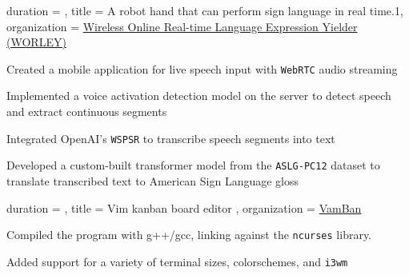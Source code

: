 \documentclass[sidebar-width=2.25in, primary=slate]{clean-resume}
\begin{document}
  \newpage

    \begin{experience}
      {
        duration = {  },
        title = {A robot hand that can perform sign language in real time.1},
        organization = {\href{https://github.com/Yubo-Cao/worley}{Wireless Online Real-time Language Expression Yielder (WORLEY)\phantom{aaaaaaaaaaaa}}}
      }
      \item Created a mobile application for live speech input with \verb|WebRTC| audio streaming
      \item Implemented a voice activation detection model on the server to detect speech and extract continuous segments
      \item Integrated OpenAI's \verb|WSPSR| to transcribe speech segments into text
      \item Developed a custom-built transformer model from the \verb|ASLG-PC12| dataset to translate transcribed text to American Sign Language gloss
    \end{experience}

    \begin{experience}
      {
        duration = {  },
        title = { Vim kanban board editor },
        organization = { \href{https://github.com/anishgoyal1108/VamBan}{VamBan} }
      }
      \item Compiled the program with g++/gcc, linking against the \verb|ncurses| library.
      \item Added support for a variety of terminal sizes, colorschemes, and \verb|i3wm|
    \end{experience}
\end{document}
